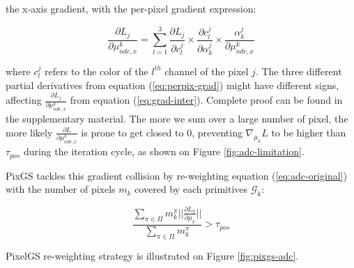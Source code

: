 

the x-axis gradient, with the per-pixel gradient expression: 

\begin{equation}
\label{eq:perpix-grad}
\frac{\partial L_{j}}{\partial \mu^{k}_{ndc,x}} = \sum \limits_{l=1}^{3} \frac{\partial L_{j}}{\partial c_{l}^{j}}\times \frac{\partial c_{l}^{j}}{\partial \alpha_{k}^{j}} \times \frac{\alpha_{k}^{j}}{\partial \mu^{k}_{ndc,x} }
\end{equation}

where $c_{l}^{j}$ refers to the color of the $l^{th}$ channel of the pixel $j$. The three different partial derivatives from equation (\ref{eq:perpix-grad}) might have different signs, affecting $\frac{\partial L_{j}}{\partial \mu^{k}_{ndc,x}}$  from equation (\ref{eq:grad-inter}). Complete proof can be found in the supplementary material. The more we sum over a large number of pixel, the more likely $\frac{\partial L}{\partial \mu^{k}_{ndc,x}}$ is prone to get closed to 0, preventing $\nabla_{\mu_{k}}L$ to be higher than $\tau_{pos}$ during the iteration cycle, as shown on Figure \ref{fig:adc-limitation}. 

PixGS tackles this gradient collision by re-weighting equation (\ref{eq:adc-original}) with the number of pixels $m_{k}$ covered by each primitives $\mathcal{G}_{k}$: 

\begin{equation}
\frac{\sum \limits_{\pi \in \Pi} m_{k}^{\pi} ||\frac{\partial L_{\pi}}{\partial \mu_{k}}||}{\sum \limits_{\pi \in \Pi}m_{k}^{\pi}} > \tau_{pos}
\label{eq:adc-original}
\end{equation}

PixelGS re-weighting strategy is illustrated on Figure \ref{fig:pixgs-adc}. 



